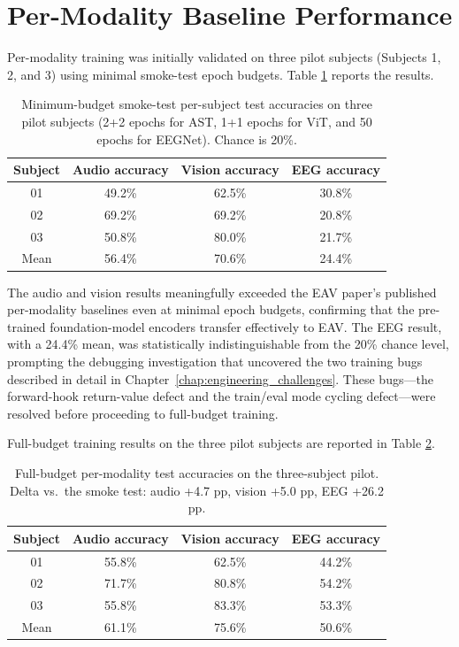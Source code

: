 \section{Per-Modality Baseline Performance}
Per-modality training was initially validated on three pilot subjects (Subjects 1, 2, and 3) using minimal smoke-test epoch budgets. Table \ref{tab:day1_smoke_test} reports the results.

\begin{table}[htbp]
\centering
\small
\caption{Minimum-budget smoke-test per-subject test accuracies on three pilot subjects (2+2 epochs for AST, 1+1 epochs for ViT, and 50 epochs for EEGNet). Chance is 20\%.}
\label{tab:day1_smoke_test}
\begin{tabular}{c c c c}
\hline
\textbf{Subject} & \textbf{Audio accuracy} & \textbf{Vision accuracy} & \textbf{EEG accuracy} \\
\hline
01 & 49.2\% & 62.5\% & 30.8\% \\
02 & 69.2\% & 69.2\% & 20.8\% \\
03 & 50.8\% & 80.0\% & 21.7\% \\
\hline
Mean & 56.4\% & 70.6\% & 24.4\% \\
\hline
\end{tabular}
\end{table}

The audio and vision results meaningfully exceeded the EAV paper's published per-modality baselines even at minimal epoch budgets, confirming that the pre-trained foundation-model encoders transfer effectively to EAV. The EEG result, with a 24.4\% mean, was statistically indistinguishable from the 20\% chance level, prompting the debugging investigation that uncovered the two training bugs described in detail in Chapter~\ref{chap:engineering_challenges}. These bugs---the forward-hook return-value defect and the train/eval mode cycling defect---were resolved before proceeding to full-budget training.

Full-budget training results on the three pilot subjects are reported in Table \ref{tab:day2_full_budget}.

\begin{table}[htbp]
\centering
\small
\caption{Full-budget per-modality test accuracies on the three-subject pilot. Delta vs.\ the smoke test: audio +4.7 pp, vision +5.0 pp, EEG +26.2 pp.}
\label{tab:day2_full_budget}
\begin{tabular}{c c c c}
\hline
\textbf{Subject} & \textbf{Audio accuracy} & \textbf{Vision accuracy} & \textbf{EEG accuracy} \\
\hline
01 & 55.8\% & 62.5\% & 44.2\% \\
02 & 71.7\% & 80.8\% & 54.2\% \\
03 & 55.8\% & 83.3\% & 53.3\% \\
\hline
Mean & 61.1\% & 75.6\% & 50.6\% \\
\hline
\end{tabular}
\end{table}

